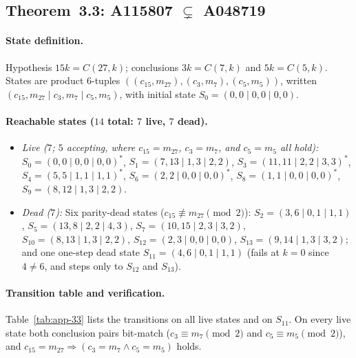 \documentclass[11pt]{article}
\begin{document}
\subsection{Theorem~3.3: A115807 $\subsetneq$ A048719}
\label{app:thm33}

\paragraph{State definition.}
Hypothesis $15k = C(27,k)$; conclusions $3k = C(7,k)$ and $5k = C(5,k)$. States are product $6$-tuples $((c_{15}, m_{27}), (c_3, m_7), (c_5, m_5))$, written $(c_{15}, m_{27} \mid c_3, m_7 \mid c_5, m_5)$, with initial state $S_0 = (0,0 \mid 0,0 \mid 0,0)$.

\paragraph{Reachable states ($14$ total: $7$ live, $7$ dead).}
\begin{itemize}
  \item \emph{Live ($7$; $5$ accepting, where $c_{15} = m_{27}$, $c_3 = m_7$, and $c_5 = m_5$ all hold):}
  $S_0 = (0,0 \mid 0,0 \mid 0,0)^*$, $S_1 = (7,13 \mid 1,3 \mid 2,2)$, $S_3 = (11,11 \mid 2,2 \mid 3,3)^*$, $S_4 = (5,5 \mid 1,1 \mid 1,1)^*$, $S_6 = (2,2 \mid 0,0 \mid 0,0)^*$, $S_8 = (1,1 \mid 0,0 \mid 0,0)^*$, $S_9 = (8,12 \mid 1,3 \mid 2,2)$.
  \item \emph{Dead ($7$):}
  Six parity-dead states ($c_{15} \not\equiv m_{27} \pmod{2}$): $S_2 = (3,6 \mid 0,1 \mid 1,1)$, $S_5 = (13,8 \mid 2,2 \mid 4,3)$, $S_7 = (10,15 \mid 2,3 \mid 3,2)$, $S_{10} = (8,13 \mid 1,3 \mid 2,2)$, $S_{12} = (2,3 \mid 0,0 \mid 0,0)$, $S_{13} = (9,14 \mid 1,3 \mid 3,2)$; and one one-step dead state $S_{11} = (4,6 \mid 0,1 \mid 1,1)$ (fails at $k = 0$ since $4 \ne 6$, and steps only to $S_{12}$ and $S_{13}$).
\end{itemize}

\paragraph{Transition table and verification.}
Table~\ref{tab:app-33} lists the transitions on all live states and on $S_{11}$. On every live state both conclusion pairs bit-match ($c_3 \equiv m_7 \pmod{2}$ and $c_5 \equiv m_5 \pmod{2}$), and $c_{15} = m_{27} \Rightarrow (c_3 = m_7 \wedge c_5 = m_5)$ holds.
\end{document}
